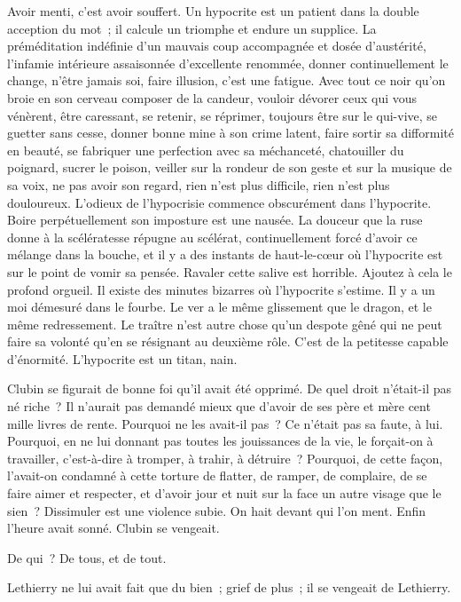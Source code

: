 \documentclass[french,twoside]{book} %
\begin{document}
Avoir menti, c’est avoir souffert. Un hypocrite est un patient dans la double acception du mot ; il calcule un triomphe et endure un supplice. La préméditation indéfinie d’un mauvais coup accompagnée et dosée d’austérité, l’infamie intérieure assaisonnée d’excellente renommée, donner continuellement le change, n’être jamais soi, faire illusion, c’est une fatigue. Avec tout ce noir qu’on broie en son cerveau composer de la candeur, vouloir dévorer ceux qui vous vénèrent, être caressant, se retenir, se réprimer, toujours être sur le qui-vive, se guetter sans cesse, donner bonne mine à son crime latent, faire sortir sa difformité en beauté, se fabriquer une perfection avec sa méchanceté, chatouiller du poignard, sucrer le poison, veiller sur la rondeur de son geste et sur la musique de sa voix, ne pas avoir son regard, rien n’est plus difficile, rien n’est plus douloureux. L’odieux de l’hypocrisie commence obscurément dans l’hypocrite. Boire perpétuellement  son imposture est une nausée. La douceur que la ruse donne à la scélératesse répugne au scélérat, continuellement forcé d’avoir ce mélange dans la bouche, et il y a des instants de haut-le-cœur où l’hypocrite est sur le point de vomir sa pensée. Ravaler cette salive est horrible. Ajoutez à cela le profond orgueil. Il existe des minutes bizarres où l’hypocrite s’estime. Il y a un moi démesuré dans le fourbe. Le ver a le même glissement que le dragon, et le même redressement. Le traître n’est autre chose qu’un despote gêné qui ne peut faire sa volonté qu’en se résignant au deuxième rôle. C’est de la petitesse capable d’énormité. L’hypocrite est un titan, nain.\par
Clubin se figurait de bonne foi qu’il avait été opprimé. De quel droit n’était-il pas né riche ? Il n’aurait pas demandé mieux que d’avoir de ses père et mère cent mille livres de rente. Pourquoi ne les avait-il pas ? Ce n’était pas sa faute, à lui. Pourquoi, en ne lui donnant pas toutes les jouissances de la vie, le forçait-on à travailler, c’est-à-dire à tromper, à trahir, à détruire ? Pourquoi, de cette façon, l’avait-on condamné à cette torture de flatter, de ramper, de complaire, de se faire aimer et respecter, et d’avoir jour et nuit sur la face un autre visage que le sien ? Dissimuler est une violence subie. On hait devant qui l’on ment. Enfin l’heure avait sonné. Clubin se vengeait.\par
De qui ? De tous, et de tout.\par
Lethierry ne lui avait fait que du bien ; grief de plus ; il se vengeait de Lethierry.\par
\end{document}
